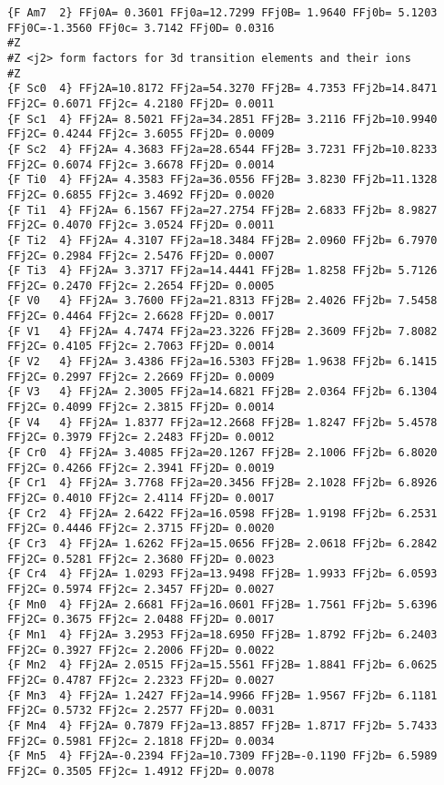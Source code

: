 {\begin{verbatim}
{F Am7  2} FFj0A= 0.3601 FFj0a=12.7299 FFj0B= 1.9640 FFj0b= 5.1203 FFj0C=-1.3560 FFj0c= 3.7142 FFj0D= 0.0316 
#Z
#Z <j2> form factors for 3d transition elements and their ions
#Z
{F Sc0  4} FFj2A=10.8172 FFj2a=54.3270 FFj2B= 4.7353 FFj2b=14.8471 FFj2C= 0.6071 FFj2c= 4.2180 FFj2D= 0.0011 
{F Sc1  4} FFj2A= 8.5021 FFj2a=34.2851 FFj2B= 3.2116 FFj2b=10.9940 FFj2C= 0.4244 FFj2c= 3.6055 FFj2D= 0.0009 
{F Sc2  4} FFj2A= 4.3683 FFj2a=28.6544 FFj2B= 3.7231 FFj2b=10.8233 FFj2C= 0.6074 FFj2c= 3.6678 FFj2D= 0.0014 
{F Ti0  4} FFj2A= 4.3583 FFj2a=36.0556 FFj2B= 3.8230 FFj2b=11.1328 FFj2C= 0.6855 FFj2c= 3.4692 FFj2D= 0.0020 
{F Ti1  4} FFj2A= 6.1567 FFj2a=27.2754 FFj2B= 2.6833 FFj2b= 8.9827 FFj2C= 0.4070 FFj2c= 3.0524 FFj2D= 0.0011 
{F Ti2  4} FFj2A= 4.3107 FFj2a=18.3484 FFj2B= 2.0960 FFj2b= 6.7970 FFj2C= 0.2984 FFj2c= 2.5476 FFj2D= 0.0007 
{F Ti3  4} FFj2A= 3.3717 FFj2a=14.4441 FFj2B= 1.8258 FFj2b= 5.7126 FFj2C= 0.2470 FFj2c= 2.2654 FFj2D= 0.0005 
{F V0   4} FFj2A= 3.7600 FFj2a=21.8313 FFj2B= 2.4026 FFj2b= 7.5458 FFj2C= 0.4464 FFj2c= 2.6628 FFj2D= 0.0017 
{F V1   4} FFj2A= 4.7474 FFj2a=23.3226 FFj2B= 2.3609 FFj2b= 7.8082 FFj2C= 0.4105 FFj2c= 2.7063 FFj2D= 0.0014 
{F V2   4} FFj2A= 3.4386 FFj2a=16.5303 FFj2B= 1.9638 FFj2b= 6.1415 FFj2C= 0.2997 FFj2c= 2.2669 FFj2D= 0.0009 
{F V3   4} FFj2A= 2.3005 FFj2a=14.6821 FFj2B= 2.0364 FFj2b= 6.1304 FFj2C= 0.4099 FFj2c= 2.3815 FFj2D= 0.0014 
{F V4   4} FFj2A= 1.8377 FFj2a=12.2668 FFj2B= 1.8247 FFj2b= 5.4578 FFj2C= 0.3979 FFj2c= 2.2483 FFj2D= 0.0012 
{F Cr0  4} FFj2A= 3.4085 FFj2a=20.1267 FFj2B= 2.1006 FFj2b= 6.8020 FFj2C= 0.4266 FFj2c= 2.3941 FFj2D= 0.0019 
{F Cr1  4} FFj2A= 3.7768 FFj2a=20.3456 FFj2B= 2.1028 FFj2b= 6.8926 FFj2C= 0.4010 FFj2c= 2.4114 FFj2D= 0.0017 
{F Cr2  4} FFj2A= 2.6422 FFj2a=16.0598 FFj2B= 1.9198 FFj2b= 6.2531 FFj2C= 0.4446 FFj2c= 2.3715 FFj2D= 0.0020 
{F Cr3  4} FFj2A= 1.6262 FFj2a=15.0656 FFj2B= 2.0618 FFj2b= 6.2842 FFj2C= 0.5281 FFj2c= 2.3680 FFj2D= 0.0023 
{F Cr4  4} FFj2A= 1.0293 FFj2a=13.9498 FFj2B= 1.9933 FFj2b= 6.0593 FFj2C= 0.5974 FFj2c= 2.3457 FFj2D= 0.0027 
{F Mn0  4} FFj2A= 2.6681 FFj2a=16.0601 FFj2B= 1.7561 FFj2b= 5.6396 FFj2C= 0.3675 FFj2c= 2.0488 FFj2D= 0.0017 
{F Mn1  4} FFj2A= 3.2953 FFj2a=18.6950 FFj2B= 1.8792 FFj2b= 6.2403 FFj2C= 0.3927 FFj2c= 2.2006 FFj2D= 0.0022 
{F Mn2  4} FFj2A= 2.0515 FFj2a=15.5561 FFj2B= 1.8841 FFj2b= 6.0625 FFj2C= 0.4787 FFj2c= 2.2323 FFj2D= 0.0027 
{F Mn3  4} FFj2A= 1.2427 FFj2a=14.9966 FFj2B= 1.9567 FFj2b= 6.1181 FFj2C= 0.5732 FFj2c= 2.2577 FFj2D= 0.0031 
{F Mn4  4} FFj2A= 0.7879 FFj2a=13.8857 FFj2B= 1.8717 FFj2b= 5.7433 FFj2C= 0.5981 FFj2c= 2.1818 FFj2D= 0.0034 
{F Mn5  4} FFj2A=-0.2394 FFj2a=10.7309 FFj2B=-0.1190 FFj2b= 6.5989 FFj2C= 0.3505 FFj2c= 1.4912 FFj2D= 0.0078 

\end{verbatim}}

